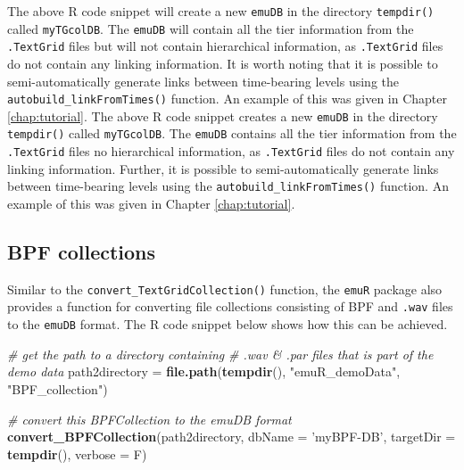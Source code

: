 \documentclass[]{book}
\newenvironment{Shaded}{\begin{snugshade}}{\end{snugshade}}
\newcommand{\CommentTok}[1]{\textcolor[rgb]{0.56,0.35,0.01}{\textit{#1}}}
\newcommand{\DataTypeTok}[1]{\textcolor[rgb]{0.13,0.29,0.53}{#1}}
\newcommand{\KeywordTok}[1]{\textcolor[rgb]{0.13,0.29,0.53}{\textbf{#1}}}
\newcommand{\NormalTok}[1]{#1}
\newcommand{\StringTok}[1]{\textcolor[rgb]{0.31,0.60,0.02}{#1}}
\theoremstyle{definition}
\theoremstyle{definition}
\theoremstyle{definition}
\theoremstyle{remark}
\begin{document}
The above R code snippet will create a new \texttt{emuDB} in the
directory \texttt{tempdir()} called \texttt{myTGcolDB}. The
\texttt{emuDB} will contain all the tier information from the
\texttt{.TextGrid} files but will not contain hierarchical information,
as \texttt{.TextGrid} files do not contain any linking information. It
is worth noting that it is possible to semi-automatically generate links
between time-bearing levels using the
\texttt{autobuild\_linkFromTimes()} function. An example of this was
given in Chapter \ref{chap:tutorial}. The above R code snippet creates a
new \texttt{emuDB} in the directory \texttt{tempdir()} called
\texttt{myTGcolDB}. The \texttt{emuDB} contains all the tier information
from the \texttt{.TextGrid} files no hierarchical information, as
\texttt{.TextGrid} files do not contain any linking information.
Further, it is possible to semi-automatically generate links between
time-bearing levels using the \texttt{autobuild\_linkFromTimes()}
function. An example of this was given in Chapter \ref{chap:tutorial}.

\hypertarget{bpf-collections}{%
\subsection{BPF collections}\label{bpf-collections}}

Similar to the \texttt{convert\_TextGridCollection()} function, the
\texttt{emuR} package also provides a function for converting file
collections consisting of BPF and \texttt{.wav} files to the
\texttt{emuDB} format. The R code snippet below shows how this can be
achieved.

\begin{Shaded}
\begin{Highlighting}[]
\CommentTok{# get the path to a directory containing}
\CommentTok{# .wav & .par files that is part of the demo data}
\NormalTok{path2directory =}\StringTok{ }\KeywordTok{file.path}\NormalTok{(}\KeywordTok{tempdir}\NormalTok{(),}
                           \StringTok{"emuR_demoData"}\NormalTok{,}
                           \StringTok{"BPF_collection"}\NormalTok{)}

\CommentTok{# convert this BPFCollection to the emuDB format}
\KeywordTok{convert_BPFCollection}\NormalTok{(path2directory, }\DataTypeTok{dbName =} \StringTok{'myBPF-DB'}\NormalTok{,}
                      \DataTypeTok{targetDir =} \KeywordTok{tempdir}\NormalTok{(), }\DataTypeTok{verbose =}\NormalTok{ F)}
\end{Highlighting}
\end{Shaded}
\end{document}
